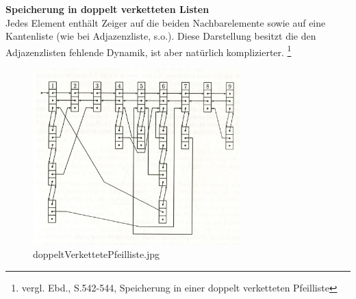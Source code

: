 \textbf{Speicherung in doppelt verketteten Listen}\\
Jedes Element enthält Zeiger auf die beiden Nachbarelemente sowie auf eine Kantenliste (wie bei Adjazenzliste, s.o.).
Diese Darstellung besitzt die den Adjazenzlisten fehlende Dynamik, ist aber natürlich komplizierter.
 \footnote{vergl. Ebd., S.542-544, Speicherung in einer doppelt verketteten Pfeilliste}
 
\begin{figure}[h]
\centering
\includegraphics[width = 8cm]{./chapters/doppeltVerkettetePfeilliste.jpg}
\caption{doppeltVerkettetePfeilliste.jpg \cite[S.543 Abb 8.7]{OttWid90}
}
\label{a4}
\end{figure}


